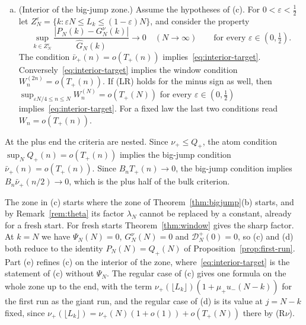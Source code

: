 \begin{introtheorem}
\begin{enumerate}[(a)]
\[\]
where $B_N^{-1}\mathcal D^\plus_N(j)=\sum_{1\le m<N/2}\nu_\plus(N-m)\Pi^\minus_m(j)$ does
not involve the scales. The defect term is $o(T_\plus(N))$ for every $j\ge1$ if
$\bar\nu_\plus(n)=o(T_\plus(n))$, and if it is $o(T_\plus(N))$ for one $j\ge1$, then
$\nu_\plus(N-m_0)=o(T_\plus(N))$ for some fixed $m_0=m_0(j)\ge1$. For a fixed law both
conditions read $\nu_\plus(n)=o(T_\plus(n))$, and then $P_N(N-j)/T_\plus(N)\to\kappa_\plus(j)$
for every $j\ge1$. If $\nu_\plus$ satisfies (R$\nu$), then
$B_N^{-1}\mathcal D^\plus_N(j)=\nu_\plus(N)\bigl(1+\mu_\plus u_\minus(j)\bigr)+o\bigl(\nu_\plus(N)+T_\plus(N)\bigr)$
for every $j\ge1$.
\item (Interior of the big-jump zone.) Assume the hypotheses of (c). For
$0<\varepsilon<\frac12$ let $Z^\varepsilon_N=\{k:\varepsilon N\le L_k\le(1-\varepsilon)N\}$,
and consider the property
\begin{equation}\label{eq:interior-target}
 \sup_{k\in Z^\varepsilon_N}\frac{|P_N(k)-G^\nu_N(k)|}{\widehat G_N(k)}\to0
 \quad(N\to\infty)\qquad\text{for every }\varepsilon\in(0,\tfrac12).
\end{equation}
The condition $\bar\nu_\plus(n)=o(T_\plus(n))$ implies~\eqref{eq:interior-target}.
Conversely~\eqref{eq:interior-target} implies the window condition
$W^{(2n)}_n=o(T_\plus(n))$. If (LR) holds for the minus sign as well, then
$\sup_{\varepsilon N/4\le n\le N}W^{(N)}_n=o(T_\plus(N))$ for every $\varepsilon\in(0,\frac12)$
implies~\eqref{eq:interior-target}. For a fixed law the last two conditions read
$W_n=o(T_\plus(n))$.
\end{enumerate}
At the plus end the criteria are nested. Since $\nu_\plus\le Q_\plus$, the atom
condition $\sup_NQ_\plus(n)=o(T_\plus(n))$ implies the big-jump condition
$\bar\nu_\plus(n)=o(T_\plus(n))$. Since $B_nT_\plus(n)\to0$, the big-jump condition
implies $B_n\bar\nu_\plus(n/2)\to0$, which is the plus half of the bulk criterion.
\end{introtheorem}

The zone in (c) starts where the zone of Theorem~\ref{thm:bigjump}(b) starts, and by
Remark~\ref{rem:theta} its factor $\lambda_N$ cannot be replaced by a constant, already
for a fresh start. For fresh starts Theorem~\ref{thm:window} gives the sharp factor. At $k=N$ we have $\Psi_N(N)=0$, $G^\nu_N(N)=0$ and
$\mathcal D^\plus_N(0)=0$, so (c) and (d) both reduce to the identity
$P_N(N)=Q_\plus(N)$ of Proposition~\ref{prop:first-run}. Part (e) refines (c) on
the interior of the zone, where~\eqref{eq:interior-target} is the statement of (c)
without $\Psi_N$. The regular case of (c) gives one formula on the whole zone up to the
end, with the term $\nu_\plus(\lfloor L_k\rfloor)(1+\mu_\plus u_\minus(N-k))$ for the first
run as the giant run, and the regular case of (d) is its value at $j=N-k$ fixed, since
$\nu_\plus(\lfloor L_k\rfloor)=\nu_\plus(N)(1+o(1))+o(T_\plus(N))$ there by (R$\nu$).

